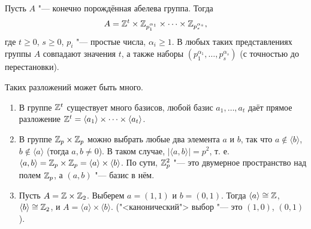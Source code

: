 \documentclass[main]{subfiles}
\begin{document}
\begin{theorem}
  Пусть \( A \) "--- конечно порождённая абелева группа.
  Тогда
  \[
    A = \mathbb{Z}^t \times \mathbb{Z}_{p_1^{\alpha_1}} \times
    \dots \times \mathbb{Z}_{p_s^{\alpha_s}},
  \]
  где \( t \ge 0 \), \( s \ge 0 \), \( p_i \) "---
  простые числа, \( \alpha_i \ge 1 \).
  В любых таких представлениях группы \( A \)
  совпадают значения \( t \),
  а также наборы \( (p_1^{\alpha_1}, \dots, p_s^{\alpha_s}) \)
  (с точностью до перестановки).
\end{theorem}
\begin{remark}
  Таких разложений может быть много.
  \begin{enumerate}
    \item В группе \( \mathbb{Z}^t \) существует много базисов,
      любой базис \( a_1, \dots, a_t \) даёт прямое
      разложение \( \mathbb{Z}^t = \langle a_1 \rangle \times
      \dots \times \langle a_t \rangle \).
    \item В группе \( \mathbb{Z}_p \times \mathbb{Z}_p \)
      можно выбрать любые два элемента \( a \) и \( b \),
      так что \( a \notin \langle b \rangle \),
      \( b \notin \langle a \rangle \) (тогда \( a, b \ne 0 \)).
      В таком случае, \( |\langle a, b \rangle| = p^2 \), т. е.
      \( \langle a, b \rangle = \mathbb{Z}_p \times \mathbb{Z}_p =
      \langle a \rangle \times \langle b \rangle \).
      По сути, \( \mathbb{Z}_p^2 \) "--- это двумерное пространство
      над полем \( \mathbb{Z}_p \), а \( (a, b) \) "--- базис в нём.
    \item Пусть \( A = \mathbb{Z} \times \mathbb{Z}_2 \).
      Выберем \( a = (1, 1) \) и \( b = (0, 1) \).
      Тогда \( \langle a \rangle \cong \mathbb{Z} \),
      \( \langle b \rangle \cong \mathbb{Z}_2 \),
      и \( A = \langle a \rangle \times \langle b \rangle \).
      ("<канонический"> выбор "--- это \( (1, 0) \), \( (0, 1) \)).
  \end{enumerate}
\end{remark}
\end{document}
